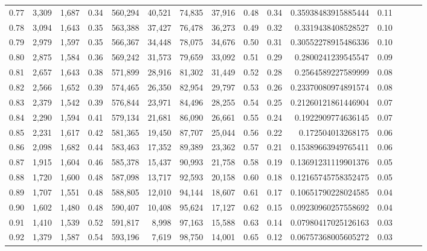 \begin{tabular}{rrrrrrrrrrrrrrr}
0.77 &   3,309 &  1,687 &  0.34 &  560,294 &   40,521 &   74,835 &   37,916 &  0.48 &  0.34 &   0.35938483915885444 &      0.11 \\
0.78 &   3,094 &  1,643 &  0.35 &  563,388 &   37,427 &   76,478 &   36,273 &  0.49 &  0.32 &    0.3319438408528527 &      0.10 \\
0.79 &   2,979 &  1,597 &  0.35 &  566,367 &   34,448 &   78,075 &   34,676 &  0.50 &  0.31 &   0.30552278915486336 &      0.10 \\
0.80 &   2,875 &  1,584 &  0.36 &  569,242 &   31,573 &   79,659 &   33,092 &  0.51 &  0.29 &    0.2800241239545547 &      0.09 \\
0.81 &   2,657 &  1,643 &  0.38 &  571,899 &   28,916 &   81,302 &   31,449 &  0.52 &  0.28 &    0.2564589227589999 &      0.08 \\
0.82 &   2,566 &  1,652 &  0.39 &  574,465 &   26,350 &   82,954 &   29,797 &  0.53 &  0.26 &   0.23370080974891574 &      0.08 \\
0.83 &   2,379 &  1,542 &  0.39 &  576,844 &   23,971 &   84,496 &   28,255 &  0.54 &  0.25 &   0.21260121861446904 &      0.07 \\
0.84 &   2,290 &  1,594 &  0.41 &  579,134 &   21,681 &   86,090 &   26,661 &  0.55 &  0.24 &    0.1922909774636145 &      0.07 \\
0.85 &   2,231 &  1,617 &  0.42 &  581,365 &   19,450 &   87,707 &   25,044 &  0.56 &  0.22 &     0.172504013268175 &      0.06 \\
0.86 &   2,098 &  1,682 &  0.44 &  583,463 &   17,352 &   89,389 &   23,362 &  0.57 &  0.21 &   0.15389663949765411 &      0.06 \\
0.87 &   1,915 &  1,604 &  0.46 &  585,378 &   15,437 &   90,993 &   21,758 &  0.58 &  0.19 &   0.13691231119901376 &      0.05 \\
0.88 &   1,720 &  1,600 &  0.48 &  587,098 &   13,717 &   92,593 &   20,158 &  0.60 &  0.18 &   0.12165745758352475 &      0.05 \\
0.89 &   1,707 &  1,551 &  0.48 &  588,805 &   12,010 &   94,144 &   18,607 &  0.61 &  0.17 &   0.10651790228024585 &      0.04 \\
0.90 &   1,602 &  1,480 &  0.48 &  590,407 &   10,408 &   95,624 &   17,127 &  0.62 &  0.15 &   0.09230960257558692 &      0.04 \\
0.91 &   1,410 &  1,539 &  0.52 &  591,817 &    8,998 &   97,163 &   15,588 &  0.63 &  0.14 &   0.07980417025126163 &      0.03 \\
0.92 &   1,379 &  1,587 &  0.54 &  593,196 &    7,619 &   98,750 &   14,001 &  0.65 &  0.12 &   0.06757368005605272 &      0.03 \\

\end{tabular}
